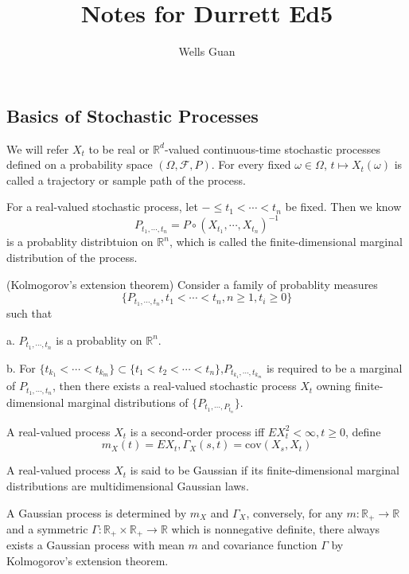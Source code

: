 \documentclass[lang=en, color=blue, ]{elegantbook}
\title{Notes for Durrett Ed5}
\author{Wells Guan}
\newcommand{\F}{\mathcal{F}}
\newcommand{\R}{\mathbb{R}}
\begin{document}


\chapter{}
\section{Basics of Stochastic Processes}

We will refer $X_t$ to be real or $\R^d$-valued continuous-time stochastic processes defined on a probability space $(\Omega,\F,P)$. For every fixed $\omega\in\Omega$, $t\mapsto X_t(\omega)$ is called a trajectory or sample path of the process.\par

For a real-valued stochastic process, let $-\leq t_1 < \cdots < t_n$ be fixed. Then we know
\[P_{t_1,\cdots,t_n} = P\circ (X_{t_1},\cdots,X_{t_n})^{-1}\]
is a probablity distribtuion on $\R^n$, which is called the finite-dimensional marginal distribution of the process.

\begin{theorem}
    (Kolmogorov's extension theorem) Consider a family of probablity measures
    \[\{P_{t_1,\cdots,t_n}, t_1<\cdots<t_n, n\geq 1, t_i\geq 0\}\]
    such that\par
    a. $P_{t_1,\cdots,t_n}$ is a probablity on $\R^n$.\par
    b. For $\{t_{k_1}<\cdots<t_{k_m}\} \subset \{t_1<t_2<\cdots<t_n\}$,$P_{t_{k_1},\cdots,t_{k_m}}$ is required to be a marginal of $P_{t_1,\cdots,t_n}$, then there exists a real-valued stochastic process $X_t$ owning finite-dimensional marginal distributions of $\{P_{t_1,\cdots,P_{t_n}}\}$.
\end{theorem}

\begin{definition}
    A real-valued process $X_t$ is a second-order process iff $EX_t^2 < \infty, t\geq 0$, define
    \[m_X(t) = EX_t, \Gamma_X(s,t) = \text{cov}(X_s,X_t)\]
\end{definition}

\begin{definition}
    A real-valued process $X_t$ is said to be Gaussian if its finite-dimensional marginal distributions are multidimensional Gaussian laws.
\end{definition}

\begin{proposition}
    A Gaussian process is determined by $m_X$ and $\Gamma_X$, conversely, for any $m:\R_+\to\R$ and a symmetric $\Gamma:\R_+\times\R_+\to\R$ which is nonnegative definite, there always exists a Gaussian process with mean $m$ and covariance function $\Gamma$ by Kolmogorov's extension theorem. 
\end{proposition}
\end{document}
